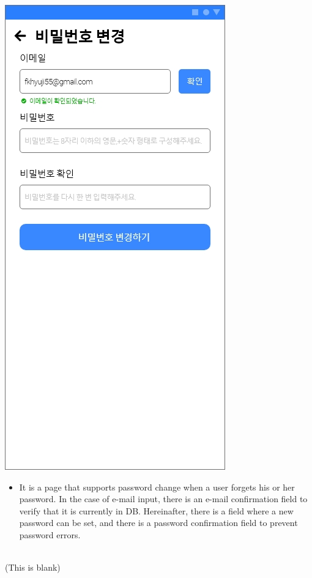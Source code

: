 \documentclass[conference]{IEEEtran}
\begin{document}
\begin{enumerate}
    \centerline{\includegraphics[scale=0.32]{assets/비밀번호 변경.jpg}}
    \begin{itemize}
    \item[] It is a page that supports password change when a user forgets his or her password. In the case of e-mail input, there is an e-mail confirmation field to verify that it is currently in DB. Hereinafter, there is a field where a new password can be set, and there is a password confirmation field to prevent password errors. \\ \\ 
    \end{itemize}
    \end{enumerate}

\textcolor[rgb]{1,1,1}{(This is blank)} \\ \\ \\ \\ \\ \\ \\ \\ \\ \\
\end{document}
